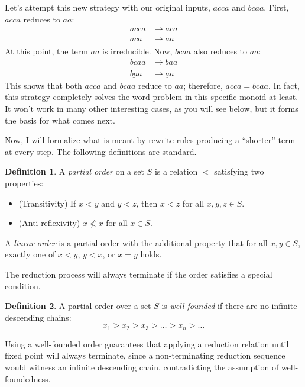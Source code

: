 \documentclass[a4paper,headsepline,bibliography=totoc,toc=flat,fleqn,twoside=semi]{scrbook}
\theoremstyle{definition}
\newtheorem{definition}{Definition}[chapter]
\theoremstyle{definition}
\theoremstyle{definition}
\begin{document}
Let's attempt this new strategy with our original inputs, $acca$ and $bcaa$. First, $acca$ reduces to $aa$:
\begin{align}
a\underline{cc}a&\rightarrow a\underline{c}a\tag{Rule 1}\\
a\underline{ca}&\rightarrow a\underline{a}\tag{Rule 3}
\end{align}
At this point, the term $aa$ is irreducible. Now, $bcaa$ also reduces to $aa$:
\begin{align}
b\underline{ca}a&\rightarrow b\underline{a}a\tag{Rule 3}\\
\underline{ba}a&\rightarrow \underline{a}a\tag{Rule 2}
\end{align}
This shows that both $acca$ and $bcaa$ reduce to $aa$; therefore, $acca=bcaa$. In fact, this strategy completely solves the word problem in this specific monoid at least. It won't work in many other interesting cases, as you will see below, but it forms the basis for what comes next.

Now, I will formalize what is meant by rewrite rules producing a ``shorter'' term at every step. The following definitions are standard.
\begin{definition}\label{partialorderdef}
A \emph{partial order} on a set $S$ is a relation $<$ satisfying two properties:
\begin{itemize}
\item (Transitivity) If $x<y$ and $y<z$, then $x<z$ for all $x,y,z \in S$.
\item (Anti-reflexivity) $x\nless x$ for all $x\in S$.
\end{itemize}
A \emph{linear order} is a partial order with the additional property that for all $x, y \in S$, exactly one of $x<y$, $y<x$, or $x=y$ holds.
\end{definition}

The reduction process will always terminate if the order satisfies a special condition.
\begin{definition}\label{wellfounded}
A partial order over a set $S$ is \emph{well-founded} if there are no infinite descending chains:
\[x_1>x_2>x_3>\ldots>x_n>\ldots\]
\end{definition}

Using a well-founded order guarantees that applying a reduction relation until fixed point will always terminate, since a non-terminating reduction sequence would witness an infinite descending chain, contradicting the assumption of well-foundedness.
\end{document}
